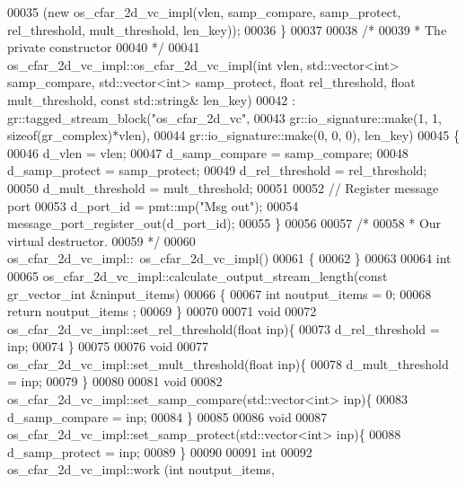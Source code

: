 \begin{DoxyCode}
00035         (\textcolor{keyword}{new} os_cfar_2d_vc_impl(vlen, samp\_compare, samp\_protect, rel\_threshold, mult\_threshold, len\_key));
00036     \}
00037 
00038     \textcolor{comment}{/*}
00039 \textcolor{comment}{     * The private constructor}
00040 \textcolor{comment}{     */}
00041     os_cfar_2d_vc_impl::os_cfar_2d_vc_impl(\textcolor{keywordtype}{int} vlen, std::vector<int> samp\_compare, std::vector<int> 
      samp\_protect, \textcolor{keywordtype}{float} rel\_threshold, \textcolor{keywordtype}{float} mult\_threshold, \textcolor{keyword}{const} std::string& len\_key)
00042       : gr::tagged\_stream\_block(\textcolor{stringliteral}{"os\_cfar\_2d\_vc"},
00043               gr::io\_signature::make(1, 1, sizeof(gr\_complex)*vlen),
00044               gr::io\_signature::make(0, 0, 0), len\_key)
00045     \{
00046         d_vlen = vlen;
00047         d_samp_compare = samp\_compare;
00048         d_samp_protect = samp\_protect;
00049         d_rel_threshold = rel\_threshold;
00050         d_mult_threshold = mult\_threshold;
00051         
00052         \textcolor{comment}{// Register message port}
00053         d_port_id = pmt::mp(\textcolor{stringliteral}{"Msg out"});
00054         message\_port\_register\_out(d_port_id);
00055     \}
00056 
00057     \textcolor{comment}{/*}
00058 \textcolor{comment}{     * Our virtual destructor.}
00059 \textcolor{comment}{     */}
00060     os_cfar_2d_vc_impl::~os_cfar_2d_vc_impl()
00061     \{
00062     \}
00063 
00064     \textcolor{keywordtype}{int}
00065     os_cfar_2d_vc_impl::calculate_output_stream_length(\textcolor{keyword}{const} gr\_vector\_int &ninput\_items)
00066     \{
00067       \textcolor{keywordtype}{int} noutput\_items = 0;
00068       \textcolor{keywordflow}{return} noutput\_items ;
00069     \}
00070     
00071     \textcolor{keywordtype}{void}
00072     os_cfar_2d_vc_impl::set_rel_threshold(\textcolor{keywordtype}{float} inp)\{
00073         d_rel_threshold = inp;
00074     \}
00075     
00076     \textcolor{keywordtype}{void}
00077     os_cfar_2d_vc_impl::set_mult_threshold(\textcolor{keywordtype}{float} inp)\{
00078         d_mult_threshold = inp;
00079     \}
00080     
00081     \textcolor{keywordtype}{void}
00082     os_cfar_2d_vc_impl::set_samp_compare(std::vector<int> inp)\{
00083         d_samp_compare = inp;
00084     \}
00085     
00086     \textcolor{keywordtype}{void}
00087     os_cfar_2d_vc_impl::set_samp_protect(std::vector<int> inp)\{
00088         d_samp_protect = inp;
00089     \}
00090 
00091     \textcolor{keywordtype}{int}
00092     os_cfar_2d_vc_impl::work (\textcolor{keywordtype}{int} noutput\_items,

\end{DoxyCode}
